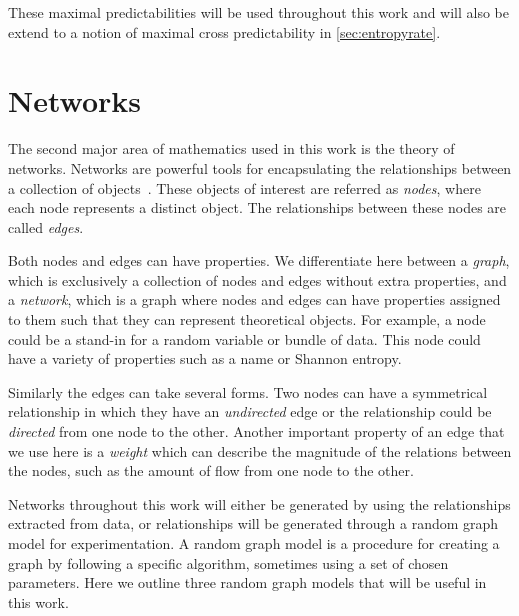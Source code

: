 These maximal predictabilities will be used throughout this work and will also be extend to a notion of maximal cross predictability in \autoref{sec:entropyrate}.


\section{Networks}

The second major area of mathematics used in this work is the theory of networks. Networks are powerful tools for encapsulating the relationships between a collection of objects~\cite{newman_networks_2018}. These objects of interest are referred as \emph{nodes}, where each node represents a distinct object. The relationships between these nodes are called \emph{edges}.

Both nodes and edges can have properties.  We differentiate here between a \emph{graph}, which is exclusively a collection of nodes and edges without extra properties, and a \emph{network}, which is a graph where nodes and edges can have properties assigned to them such that they can represent theoretical objects. For example, a node could be a stand-in for a random variable or bundle of data. This node could have a variety of properties such as a name or Shannon entropy.

Similarly the edges can take several forms. Two nodes can have a symmetrical relationship in which they have an \emph{undirected} edge or the relationship could be \emph{directed} from one node to the other. Another important property of an edge that we use here is a \emph{weight} which can describe the magnitude of the relations between the nodes, such as the amount of flow from one node to the other.

Networks throughout this work will either be generated by using the relationships extracted from data, or relationships will be generated through a random graph model for experimentation. A random graph model is a procedure for creating a graph by following a specific algorithm, sometimes using a set of chosen parameters.  Here we outline three random graph models that will be useful in this work.

